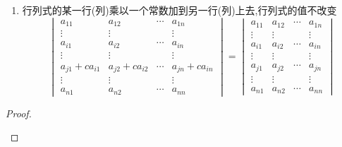 {\begin{enumerate}[label = {\textup{(\arabic*)}}]
\begin{align*}
\begin{vmatrix}
                      \vdots & \vdots &        & \vdots \\
                      b_{r1} & b_{r2} & \cdots & b_{rn} \\
                      \vdots & \vdots &        & \vdots \\
                      a_{n1} & a_{n2} & \cdots & a_{nn}
                  \end{vmatrix}
              \end{align*}
        \item 行列式的某一行(列)乘以一个常数加到另一行(列)上去,行列式的值不改变
              \[
                  \begin{vmatrix}
                      a_{11}         & a_{12}         & \cdots & a_{1n}         \\
                      \vdots         & \vdots         &        & \vdots         \\
                      a_{i1}         & a_{i2}         & \cdots & a_{in}         \\
                      \vdots         & \vdots         &        & \vdots         \\
                      a_{j1}+ca_{i1} & a_{j2}+ca_{i2} & \cdots & a_{jn}+ca_{in} \\
                      \vdots         & \vdots         &        & \vdots         \\
                      a_{n1}         & a_{n2}         & \cdots & a_{nn}
                  \end{vmatrix}=
                  \begin{vmatrix}
                      a_{11} & a_{12} & \cdots & a_{1n} \\
                      \vdots & \vdots &        & \vdots \\
                      a_{i1} & a_{i2} & \cdots & a_{in} \\
                      \vdots & \vdots &        & \vdots \\
                      a_{j1} & a_{j2} & \cdots & a_{jn} \\
                      \vdots & \vdots &        & \vdots \\
                      a_{n1} & a_{n2} & \cdots & a_{nn}
                  \end{vmatrix}
              \]
    \end{enumerate}
    \begin{proof}
        \begin{enumerate}[label = {\textup{(\arabic*)}}]

\end{enumerate}
\end{proof}}
